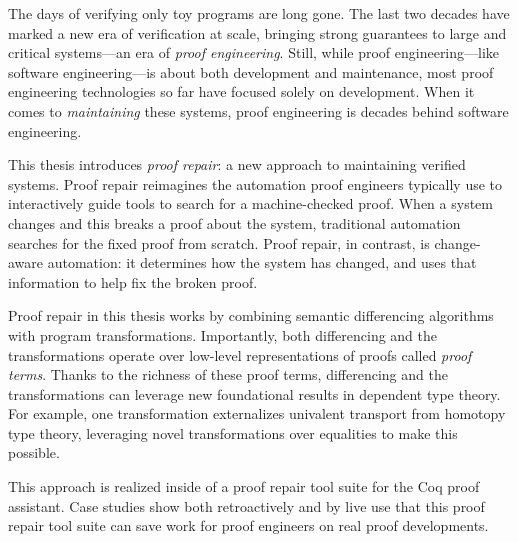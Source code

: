 \documentclass[ twoside,openright,titlepage,numbers=noenddot,headinclude,
                footinclude=true,cleardoublepage=empty,abstractoff,%
                BCOR=5mm,paper=letter,fontsize=11pt,letterpaper,%
                american,%
                ]{scrreprt}
\begin{document}
The days of verifying only toy programs are long gone.
The last two decades have marked a new era of verification at scale, bringing strong guarantees to large and critical systems---an era of \textit{proof engineering}.
Still, while proof engineering---like software engineering---is about both development and maintenance, most proof engineering technologies so far 
have focused solely on development.
When it comes to \textit{maintaining} these systems, proof engineering is decades behind software engineering.

This thesis introduces \textit{proof repair}: a new approach to maintaining verified systems.
Proof repair reimagines the automation proof engineers typically use to interactively guide tools to
search for a machine-checked proof.
When a system changes and this breaks a proof about the system, traditional automation searches for the fixed proof from scratch.
Proof repair, in contrast, is change-aware automation: it determines how the system has changed, and uses that information to help fix the broken proof.

Proof repair in this thesis works by combining semantic differencing algorithms with program transformations.
Importantly, both differencing and the transformations operate over low-level representations of proofs called \textit{proof terms}.
Thanks to the richness of these proof terms, differencing and the transformations can leverage new foundational results in dependent type theory.
For example, one transformation externalizes univalent transport from homotopy type theory,
leveraging novel transformations over equalities to make this possible.

This approach is realized inside of a proof repair tool suite for the Coq proof assistant.
Case studies show both retroactively and by live use that this proof repair tool suite can save work for proof engineers on real proof developments.
\end{document}
